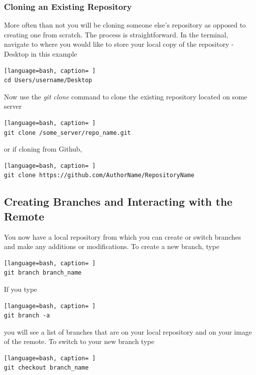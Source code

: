 \subsubsection{Cloning an Existing Repository}

More often than not you will be cloning someone else's repository as opposed to creating one from scratch. The process is straightforward. In the terminal, navigate to where you would like to store your local copy of the repository - Desktop in this example

\begin{lstlisting}[language=bash, caption= ]
cd Users/username/Desktop
\end{lstlisting}

\noindent
Now use the \textit{git clone} command to clone the existing repository located on some server

\begin{lstlisting}[language=bash, caption= ]
git clone /some_server/repo_name.git
\end{lstlisting}

\noindent
or if cloning from Github,

\begin{lstlisting}[language=bash, caption= ]
git clone https://github.com/AuthorName/RepositoryName
\end{lstlisting}

\subsection{Creating Branches and Interacting with the Remote}

You now have a local repository from which you can create or switch branches and make any additions or modifications. To create a new branch, type

\begin{lstlisting}[language=bash, caption= ]
git branch branch_name
\end{lstlisting}

\noindent
If you type

\begin{lstlisting}[language=bash, caption= ]
git branch -a
\end{lstlisting}

\noindent
you will see a list of branches that are on your local repository and on your image of the remote. To switch to your new branch type

\begin{lstlisting}[language=bash, caption= ]
git checkout branch_name
\end{lstlisting}

